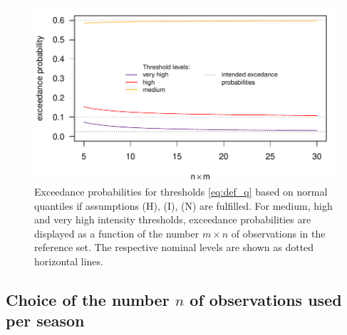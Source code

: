 \documentclass[12pt]{article}
\begin{document}
\begin{figure}[h!]
\begin{center}
\includegraphics[scale=0.6]{figure/exceedance_prob_normal.pdf}\vspace{-5mm}
\end{center}
\caption{Exceedance probabilities for thresholds \eqref{eq:def_q} based on normal quantiles if assumptions (H), (I), (N) are fulfilled. For medium, high and very high intensity thresholds, exceedance probabilities are displayed as a function of the number $m \times n$ of observations in the reference set. The respective nominal levels are shown as dotted horizontal lines.}
\label{fig:calibration_t_normal}
\end{figure}

\subsection{Choice of the number $n$ of observations used per season}
\label{subsec:choice_n}
\end{document}
